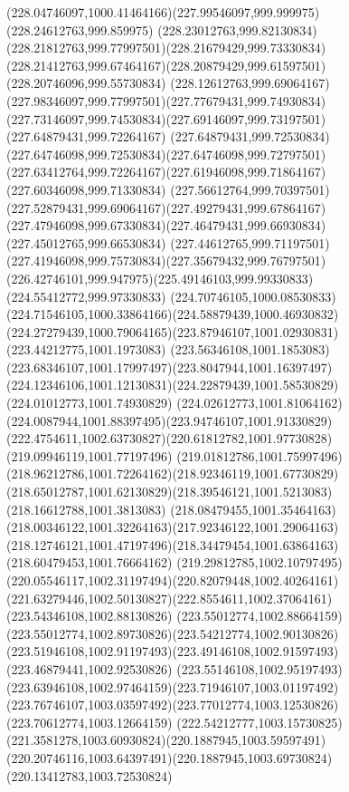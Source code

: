 {{\curveto(228.04746097,1000.41464166)(227.99546097,999.999975)(228.24612763,999.859975)
\curveto(228.23012763,999.82130834)(228.21812763,999.77997501)(228.21679429,999.73330834)
\curveto(228.21412763,999.67464167)(228.20879429,999.61597501)(228.20746096,999.55730834)
\curveto(228.12612763,999.69064167)(227.98346097,999.77997501)(227.77679431,999.74930834)
\curveto(227.73146097,999.74530834)(227.69146097,999.73197501)(227.64879431,999.72264167)
\curveto(227.64879431,999.72530834)(227.64746098,999.72530834)(227.64746098,999.72797501)
\curveto(227.63412764,999.72264167)(227.61946098,999.71864167)(227.60346098,999.71330834)
\curveto(227.56612764,999.70397501)(227.52879431,999.69064167)(227.49279431,999.67864167)
\curveto(227.47946098,999.67330834)(227.46479431,999.66930834)(227.45012765,999.66530834)
\curveto(227.44612765,999.71197501)(227.41946098,999.75730834)(227.35679432,999.76797501)
\curveto(226.42746101,999.947975)(225.49146103,999.99330833)(224.55412772,999.97330833)
\curveto(224.70746105,1000.08530833)(224.71546105,1000.33864166)(224.58879439,1000.46930832)
\curveto(224.27279439,1000.79064165)(223.87946107,1001.02930831)(223.44212775,1001.1973083)
\curveto(223.56346108,1001.1853083)(223.68346107,1001.17997497)(223.8047944,1001.16397497)
\curveto(224.12346106,1001.12130831)(224.22879439,1001.58530829)(224.01012773,1001.74930829)
\curveto(224.02612773,1001.81064162)(224.0087944,1001.88397495)(223.94746107,1001.91330829)
\curveto(222.4754611,1002.63730827)(220.61812782,1001.97730828)(219.09946119,1001.77197496)
\curveto(219.01812786,1001.75997496)(218.96212786,1001.72264162)(218.92346119,1001.67730829)
\curveto(218.65012787,1001.62130829)(218.39546121,1001.5213083)(218.16612788,1001.3813083)
\curveto(218.08479455,1001.35464163)(218.00346122,1001.32264163)(217.92346122,1001.29064163)
\curveto(218.12746121,1001.47197496)(218.34479454,1001.63864163)(218.60479453,1001.76664162)
\curveto(219.29812785,1002.10797495)(220.05546117,1002.31197494)(220.82079448,1002.40264161)
\curveto(221.63279446,1002.50130827)(222.8554611,1002.37064161)(223.54346108,1002.88130826)
\curveto(223.55012774,1002.88664159)(223.55012774,1002.89730826)(223.54212774,1002.90130826)
\curveto(223.51946108,1002.91197493)(223.49146108,1002.91597493)(223.46879441,1002.92530826)
\curveto(223.55146108,1002.95197493)(223.63946108,1002.97464159)(223.71946107,1003.01197492)
\curveto(223.76746107,1003.03597492)(223.77012774,1003.12530826)(223.70612774,1003.12664159)
\curveto(222.54212777,1003.15730825)(221.3581278,1003.60930824)(220.1887945,1003.59597491)
\curveto(220.20746116,1003.64397491)(220.1887945,1003.69730824)(220.13412783,1003.72530824)
}}
